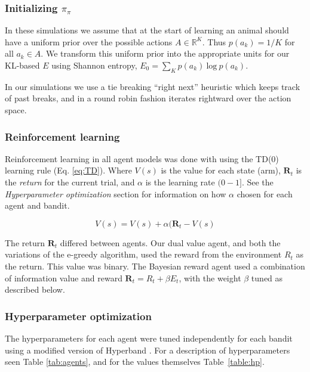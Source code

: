 \subsubsection*{Initializing $\pi_\pi$}
In these simulations we assume that at the start of learning an animal should have a uniform prior over the possible actions $A \in \mathbb{R}^K$. Thus $p(a_k) = 1/K$ for all $a_k \in A$. We transform this uniform prior into the appropriate units for our KL-based $E$ using Shannon entropy, $E_0 = \sum_K p(a_k)\ \text{log}\ p(a_k)$. 

In our simulations we use a tie breaking ``right next'' heuristic which keeps track of past breaks, and in a round robin fashion iterates rightward over the action space.

\subsubsection*{Reinforcement learning} Reinforcement learning in all agent models was done with using the TD(0) learning rule \cite{Sutton2018} (Eq. \ref{eq:TD}). Where $V(s)$ is the value for each state (arm), $\mathbf{R}_t$ is the \emph{return} for the current trial, and $\alpha$ is the learning rate $(0-1]$. See the \emph{Hyperparameter optimization} section for information on how $\alpha$ chosen for each agent and bandit.

\begin{equation}
	\label{eq:TD}
	V(s) = V(s) + \alpha (\mathbf{R}_t - V(s)
\end{equation}

The return $\mathbf{R}_t$ differed between agents. Our dual value agent, and both the variations of the e-greedy algorithm, used the reward from the environment $R_t$ as the return. This value was binary. The Bayesian reward agent used a combination of information value and reward $\mathbf{R}_t = R_t + \beta E_t$, with the weight $\beta$ tuned as described below. 

\subsubsection*{Hyperparameter optimization}
The hyperparameters for each agent were tuned independently for each bandit using a modified version of Hyperband \cite{Li2016a}. For a description of hyperparameters seen Table \ref{tab:agents}, and for the values themselves Table~\ref{table:hp}.

